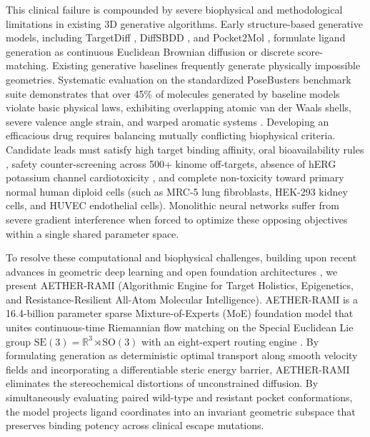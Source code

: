 \documentclass[11pt,a4paper]{article}
\begin{document}
This clinical failure is compounded by severe biophysical and methodological limitations in existing 3D generative algorithms. Early structure-based generative models, including TargetDiff \cite{guan2023targetdiff}, DiffSBDD \cite{schneuing2022diffsbdd}, and Pocket2Mol \cite{peng2022pocket2mol}, formulate ligand generation as continuous Euclidean Brownian diffusion or discrete score-matching. Existing generative baselines frequently generate physically impossible geometries. Systematic evaluation on the standardized PoseBusters benchmark suite demonstrates that over 45\% of molecules generated by baseline models violate basic physical laws, exhibiting overlapping atomic van der Waals shells, severe valence angle strain, and warped aromatic systems \cite{van2023posebusters}. Developing an efficacious drug requires balancing mutually conflicting biophysical criteria. Candidate leads must satisfy high target binding affinity, oral bioavailability rules \cite{lipinski2001experimental,veber2002molecular}, safety counter-screening across 500+ kinome off-targets, absence of hERG potassium channel cardiotoxicity \cite{sanguinetti2006herg,redfern2003relationships}, and complete non-toxicity toward primary normal human diploid cells (such as MRC-5 lung fibroblasts, HEK-293 kidney cells, and HUVEC endothelial cells). Monolithic neural networks suffer from severe gradient interference when forced to optimize these opposing objectives within a single shared parameter space.

To resolve these computational and biophysical challenges, building upon recent advances in geometric deep learning and open foundation architectures \cite{lipman2023flow,albergo2023building}, we present AETHER-RAMI (Algorithmic Engine for Target Holistics, Epigenetics, and Resistance-Resilient All-Atom Molecular Intelligence). AETHER-RAMI is a 16.4-billion parameter sparse Mixture-of-Experts (MoE) foundation model that unites continuous-time Riemannian flow matching on the Special Euclidean Lie group $\mathrm{SE}(3) = \mathbb{R}^3 \rtimes \mathrm{SO}(3)$ \cite{lipman2023flow,albergo2023building} with an eight-expert routing engine \cite{shazeer2017outrageously,fedus2022switch,jiang2024mixtral}. By formulating generation as deterministic optimal transport along smooth velocity fields and incorporating a differentiable steric energy barrier, AETHER-RAMI eliminates the stereochemical distortions of unconstrained diffusion. By simultaneously evaluating paired wild-type and resistant pocket conformations, the model projects ligand coordinates into an invariant geometric subspace that preserves binding potency across clinical escape mutations.
\end{document}
